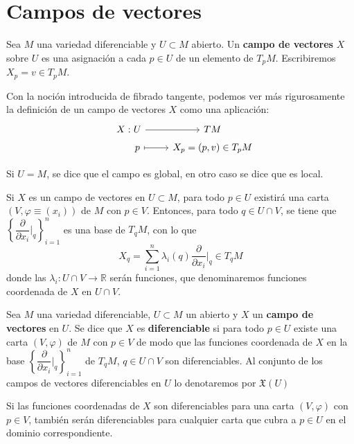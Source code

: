 \justifying \setcounter{page}{39}\setcounter{chapter}{3}
\chapter{Campos de vectores}  
\begin{defi}
Sea $M$ una variedad diferenciable y $U \subset M$ abierto. Un \textbf{campo de vectores} $X$ sobre $U$ es una asignación a cada $p \in U$ de un elemento de $T_p M$. Escribiremos $X_p = v \in T_p M$.
\end{defi}
\begin{obs}
Con la noción introducida de fibrado tangente, podemos ver más rigurosamente la definición de un campo de vectores $X$ como una aplicación: $$\begin{tikzcd}
X:\hspace{-13mm} & U \rar & TM\\[-5mm]
& p \arrow[mapsto]{r} & X_p = (p,v) \in T_pM
\end{tikzcd}$$
\end{obs}
\begin{obs}
Si $U = M$, se dice que el campo es global, en otro caso se dice que es local.
\end{obs}

Si $X$ es un campo de vectores en $U \subset M$, para todo $p \in U$ existirá una carta $(V,\varphi \equiv (x_i))$ de $M$ con $p \in V$. Entonces, para todo $q \in U \cap V$, se tiene que $\left\{\dfrac{\partial}{\partial x_i}\Big|_q\right\}_{i=1}^n$ es una base de $T_q M$, con lo que 
$$X_q = \sum_{i=1}^n \lambda_i(q) \dfrac{\partial}{\partial x_i}\Big|_q \in T_q M$$
donde las $\lambda_i: U \cap V \to \mathbb{R}$ serán funciones, que denominaremos funciones coordenada de $X$ en $U \cap V$.

\begin{defi}
Sea $M$ una variedad diferenciable, $U \subset M$ un abierto y $X$ un \textbf{campo de vectores} en $U$. Se dice que $X$ es \textbf{diferenciable} si para todo $p \in U$ existe una carta $(V,\varphi)$ de $M$ con $p \in V$ de modo que las funciones coordenada de $X$ en la base $\left\{\dfrac{\partial}{\partial x_i}\Big|_q\right\}_{i=1}^n$ de $T_qM$, $q \in U \cap V$ son diferenciables. Al conjunto de los campos de vectores diferenciables en $U$ lo denotaremos por $\mathfrak{X}(U)$
\end{defi}
\begin{obs}
    Si las funciones coordenadas de $X$ son diferenciables para una carta $(V, \varphi)$ con $p\in V$, tambi\'en ser\'an diferenciables para cualquier carta que cubra a $p\in U$ en el dominio correspondiente.
\end{obs}

